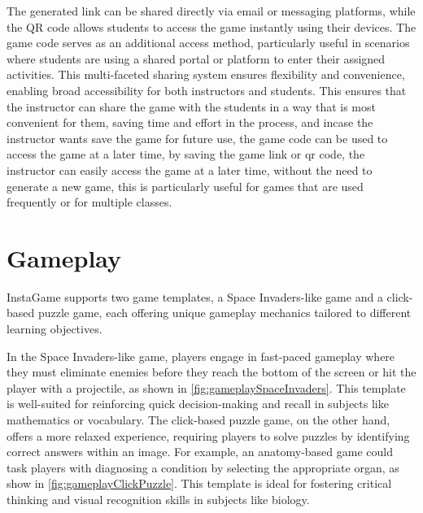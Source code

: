The generated link can be shared directly via email or messaging platforms, while the QR code allows students to access the game instantly using their devices. The game code serves as an additional access method, particularly useful in scenarios where students are using a shared portal or platform to enter their assigned activities. This multi-faceted sharing system ensures flexibility and convenience, enabling broad accessibility for both instructors and students. This ensures that the instructor can share the game with the students in a way that is most convenient for them, saving time and effort in the process, and incase the instructor wants save the game for future use, the game code can be used to access the game at a later time, by saving the game link or qr code, the instructor can easily access the game at a later time, without the need to generate a new game, this is particularly useful for games that are used frequently or for multiple classes.


\section{Gameplay}

InstaGame supports two game templates, a Space Invaders-like game and a click-based puzzle game, each offering unique gameplay mechanics tailored to different learning objectives.

In the Space Invaders-like game, players engage in fast-paced gameplay where they must eliminate enemies before they reach the bottom of the screen or hit the player with a projectile, as shown in \ref{fig:gameplaySpaceInvaders}. This template is well-suited for reinforcing quick decision-making and recall in subjects like mathematics or vocabulary. The click-based puzzle game, on the other hand, offers a more relaxed experience, requiring players to solve puzzles by identifying correct answers within an image. For example, an anatomy-based game could task players with diagnosing a condition by selecting the appropriate organ, as show in \ref{fig:gameplayClickPuzzle}. This template is ideal for fostering critical thinking and visual recognition skills in subjects like biology.

